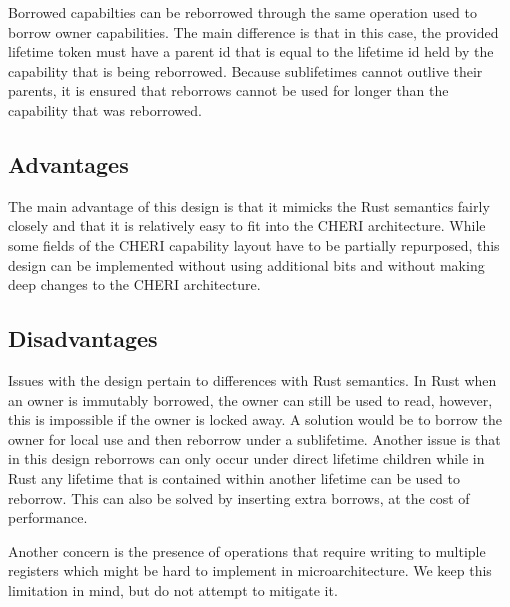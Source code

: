 Borrowed capabilties can be reborrowed through the same operation used to borrow owner capabilities. The main difference is that in this case, the provided lifetime token must have a parent id that is equal to the lifetime id held by the capability that is being reborrowed. Because sublifetimes cannot outlive their parents, it is ensured that reborrows cannot be used for longer than the capability that was reborrowed.

\subsection{Advantages}
The main advantage of this design is that it mimicks the Rust semantics fairly closely and that it is relatively easy to fit into the CHERI architecture. While some fields of the CHERI capability layout have to be partially repurposed, this design can be implemented without using additional bits and without making deep changes to the CHERI architecture.

\subsection{Disadvantages}
\label{sec:designdisadvantages}
Issues with the design pertain to differences with Rust semantics. In Rust when an owner is immutably borrowed, the owner can still be used to read, however, this is impossible if the owner is locked away. A solution would be to borrow the owner for local use and then reborrow under a sublifetime. Another issue is that in this design reborrows can only occur under direct lifetime children while in Rust any lifetime that is contained within another lifetime can be used to reborrow. This can also be solved by inserting extra borrows, at the cost of performance.

Another concern is the presence of operations that require writing to multiple registers which might be hard to implement in microarchitecture. We keep this limitation in mind, but do not attempt to mitigate it.

